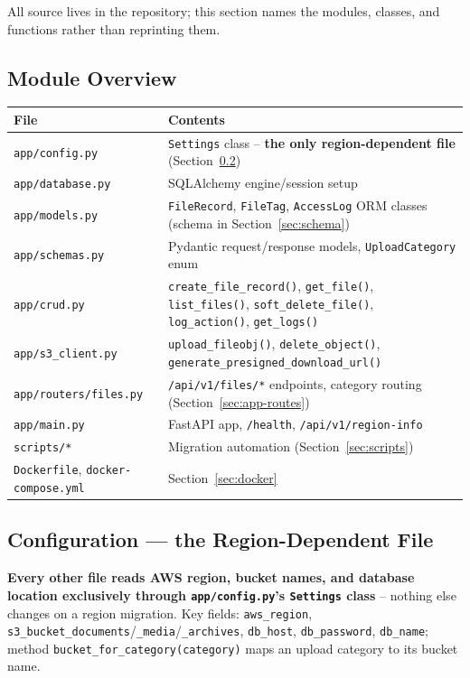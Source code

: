 \documentclass[10pt]{article}
\begin{document}
All source lives in the repository; this section names the modules,
classes, and functions rather than reprinting them.

\subsection{Module Overview}
\noindent \begin{tabularx}{\textwidth}{@{}l X@{}}
\toprule
\rowcolor{tableHead} \textbf{File} & \textbf{Contents} \\
\midrule
\texttt{app/config.py} & \texttt{Settings} class -- \textbf{the only region-dependent file} (Section~\ref{sec:config}) \\
\rowcolor{tableAlt} \texttt{app/database.py} & SQLAlchemy engine/session setup \\
\texttt{app/models.py} & \texttt{FileRecord}, \texttt{FileTag}, \texttt{AccessLog} ORM classes (schema in Section~\ref{sec:schema}) \\
\rowcolor{tableAlt} \texttt{app/schemas.py} & Pydantic request/response models, \texttt{UploadCategory} enum \\
\texttt{app/crud.py} & \texttt{create\_file\_record()}, \texttt{get\_file()}, \texttt{list\_files()}, \texttt{soft\_delete\_file()}, \texttt{log\_action()}, \texttt{get\_logs()} \\
\rowcolor{tableAlt} \texttt{app/s3\_client.py} & \texttt{upload\_fileobj()}, \texttt{delete\_object()}, \texttt{generate\_presigned\_download\_url()} \\
\texttt{app/routers/files.py} & \texttt{/api/v1/files/*} endpoints, category routing (Section~\ref{sec:app-routes}) \\
\rowcolor{tableAlt} \texttt{app/main.py} & FastAPI app, \texttt{/health}, \texttt{/api/v1/region-info} \\
\texttt{scripts/*} & Migration automation (Section~\ref{sec:scripts}) \\
\rowcolor{tableAlt} \texttt{Dockerfile}, \texttt{docker-compose.yml} & Section~\ref{sec:docker} \\
\bottomrule
\end{tabularx}

\subsection{Configuration --- the Region-Dependent File}
\label{sec:config}

\textbf{Every other file reads AWS region, bucket names, and database
location exclusively through \texttt{app/config.py}'s \texttt{Settings}
class} -- nothing else changes on a region migration. Key fields:
\texttt{aws\_region}, \texttt{s3\_bucket\_documents}/\texttt{\_media}/\texttt{\_archives},
\texttt{db\_host}, \texttt{db\_password}, \texttt{db\_name}; method \texttt{bucket\_for\_category(category)} maps
an upload category to its bucket name.
\end{document}
